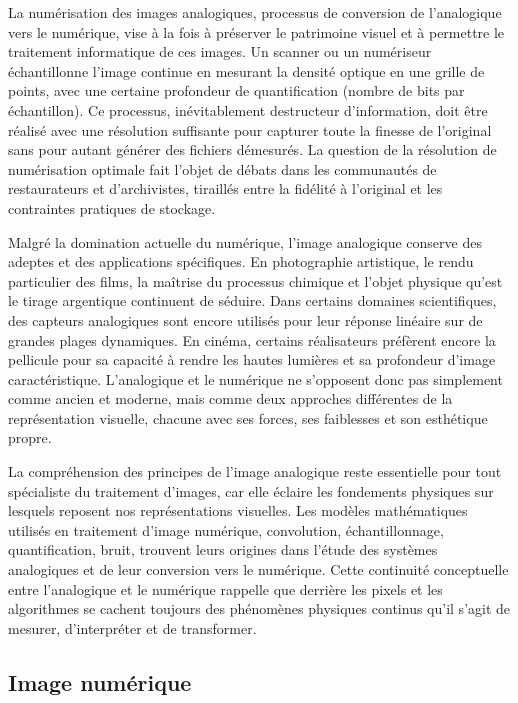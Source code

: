La numérisation des images analogiques, processus de conversion de l'analogique vers le numérique, vise à la fois à préserver le patrimoine visuel et à permettre le traitement informatique de ces images. Un scanner ou un numériseur échantillonne l'image continue en mesurant la densité optique en une grille de points, avec une certaine profondeur de quantification (nombre de bits par échantillon). Ce processus, inévitablement destructeur d'information, doit être réalisé avec une résolution suffisante pour capturer toute la finesse de l'original sans pour autant générer des fichiers démesurés. La question de la résolution de numérisation optimale fait l'objet de débats dans les communautés de restaurateurs et d'archivistes, tiraillés entre la fidélité à l'original et les contraintes pratiques de stockage.

Malgré la domination actuelle du numérique, l'image analogique conserve des adeptes et des applications spécifiques. En photographie artistique, le rendu particulier des films, la maîtrise du processus chimique et l'objet physique qu'est le tirage argentique continuent de séduire. Dans certains domaines scientifiques, des capteurs analogiques sont encore utilisés pour leur réponse linéaire sur de grandes plages dynamiques. En cinéma, certains réalisateurs préfèrent encore la pellicule pour sa capacité à rendre les hautes lumières et sa profondeur d'image caractéristique. L'analogique et le numérique ne s'opposent donc pas simplement comme ancien et moderne, mais comme deux approches différentes de la représentation visuelle, chacune avec ses forces, ses faiblesses et son esthétique propre.

La compréhension des principes de l'image analogique reste essentielle pour tout spécialiste du traitement d'images, car elle éclaire les fondements physiques sur lesquels reposent nos représentations visuelles. Les modèles mathématiques utilisés en traitement d'image numérique, convolution, échantillonnage, quantification, bruit, trouvent leurs origines dans l'étude des systèmes analogiques et de leur conversion vers le numérique. Cette continuité conceptuelle entre l'analogique et le numérique rappelle que derrière les pixels et les algorithmes se cachent toujours des phénomènes physiques continus qu'il s'agit de mesurer, d'interpréter et de transformer.
\subsection{Image numérique}

